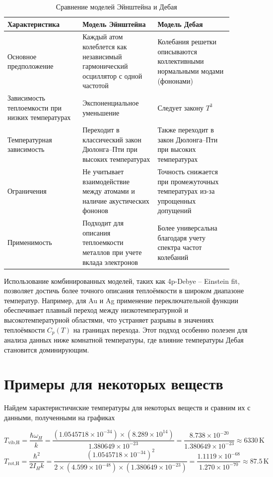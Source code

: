 \documentclass[a4paper]{article}
\begin{document}
\begin{table}[h]
\centering
\caption{Сравнение моделей Эйнштейна и Дебая}
\label{tab:models_comparison}
\begin{tabular}{|p{0.3\linewidth}|p{0.3\linewidth}|p{0.3\linewidth}|}
\hline
\textbf{Характеристика} & \textbf{Модель Эйнштейна} & \textbf{Модель Дебая} \\
\hline
Основное предположение & Каждый атом колеблется как независимый гармонический осциллятор с одной частотой & Колебания решетки описываются коллективными нормальными модами (фононами) \\
\hline
Зависимость теплоемкости при низких температурах & Экспоненциальное уменьшение & Следует закону $T^3$ \\
\hline
Температурная зависимость & Переходит в классический закон Дюлонга–Пти при высоких температурах & Также переходит в закон Дюлонга–Пти при высоких температурах \\
\hline
Ограничения & Не учитывает взаимодействие между атомами и наличие акустических фононов & Точность снижается при промежуточных температурах из-за упрощенных допущений \\
\hline
Применимость & Подходит для описания теплоемкости металлов при учете вклада электронов & Более универсальна благодаря учету спектра частот колебаний \\
\hline
\end{tabular}
\end{table}

Использование комбинированных моделей, таких как 4p-Debye -- Einstein fit, 
позволяет достичь более точного описания теплоёмкости в широком диапазоне температур. Например, для Au и Ag применение переключательной функции обеспечивает плавный переход между низкотемпературной и высокотемпературной областями, что устраняет разрывы в значениях теплоёмкости $C_p(T)$ на границах перехода. 
Этот подход особенно полезен для анализа данных ниже комнатной температуры, где влияние температуры Дебая становится доминирующим.

\section{Примеры для некоторых веществ}

Найдем характеристичиские температуры для некоторых веществ и сравним их с данными, полученными на графиках
\par
\textbf{}

\[T_{\text{vib,H}} = \frac{\hbar \omega_H}{k} = \frac{(1.0545718 \times 10^{-34}) \times (8.289 \times 10^{14})}{1.380649 \times 10^{-23}} = \frac{8.738 \times 10^{-20}}{1.380649 \times 10^{-23}} \approx 6330\,\text{K}\]
\[T_{\text{rot,H}} = \frac{\hbar^2}{2I_H k} = \frac{(1.0545718 \times 10^{-34})^2}{2 \times (4.599 \times 10^{-48}) \times (1.380649 \times 10^{-23})} = \frac{1.1119 \times 10^{-68}}{1.270 \times 10^{-70}} \approx 87.5\,\text{K}\]
\end{document}
